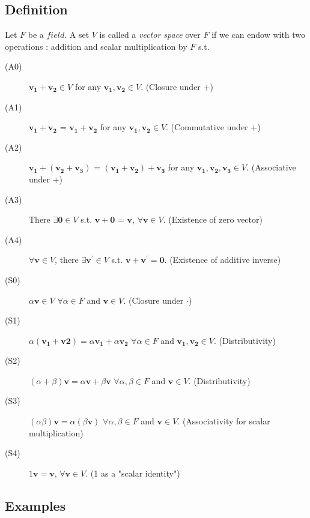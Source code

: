 \documentclass[12pt]{article}
\begin{document}
\subsection{Definition}
Let $F$ be a $field$. A set $V$ is called a \emph{vector space} over $F$ if we can endow with two operations : addition and scalar multiplication by $F$ s.t.
\begin{description}

\item[(A0)] $\mathbf{v_1} + \mathbf{v_2} \in V$ for any $\mathbf{v_1}, \mathbf{v_2} \in V$. (Closure under +)
\item[(A1)] $\mathbf{v_1} + \mathbf{v_2}$ = $\mathbf{v_1} + \mathbf{v_2}$ for any $\mathbf{v_1}, \mathbf{v_2} \in V$. (Commutative under +)
\item[(A2)] $\mathbf{v_1} + (\mathbf{v_2} + \mathbf{v_3})$ = $(\mathbf{v_1} + \mathbf{v_2}) + \mathbf{v_3}$ for any $\mathbf{v_1}, \mathbf{v_2}, \mathbf{v_3} \in V$. (Associative under +)
\item[(A3)] There $\exists \mathbf{0} \in V$ s.t. $\mathbf{v} + \mathbf{0}$ = $\mathbf{v}$, $\forall \mathbf{v} \in V$. (Existence of zero vector)
\item[(A4)] $\forall \mathbf{v} \in V$, there $\exists \mathbf{v^\prime} \in V$ s.t. $\mathbf{v} + \mathbf{v^\prime} = \mathbf{0}$. (Existence of additive inverse)
\item[(S0)] $\alpha\mathbf{v} \in V$ $\forall \alpha \in F$ and $\mathbf{v} \in V$. (Closure under $\cdot$)
\item[(S1)] $\alpha(\mathbf{v_1} + \mathbf{v2}) = \alpha\mathbf{v_1} + \alpha\mathbf{v_2}$ $\forall \alpha \in F$ and $\mathbf{v_1}, \mathbf{v_2} \in V$. (Distributivity)
\item[(S2)] $(\alpha + \beta)\mathbf{v} = \alpha\mathbf{v} + \beta\mathbf{v}$ $\forall \alpha, \beta \in F$ and $\mathbf{v} \in V$. (Distributivity)
\item[(S3)] $(\alpha\beta)\mathbf{v} = \alpha(\beta\mathbf{v})$ $\forall \alpha, \beta \in F$ and $\mathbf{v} \in V$. (Associativity for scalar multiplication)
\item[(S4)] $1\mathbf{v} = \mathbf{v}$, $\forall \mathbf{v} \in V$. (1 as a "scalar identity")

\end{description}

\subsection{Examples}
\end{document}
